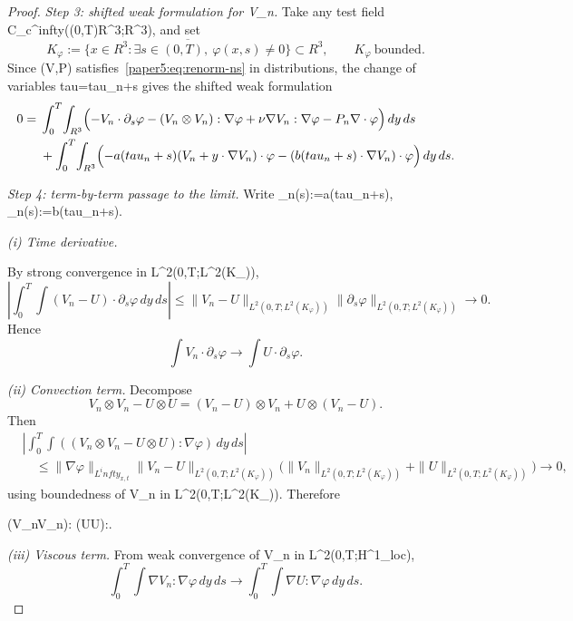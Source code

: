 \documentclass[11pt]{amsart}
\def\({}%
\def\){}%
\def\mathrm#1{#1}%
\def\mathbb#1{#1}%
\def\tau{tau}%
\def\infty{infty}%
\theoremstyle{plain}
\theoremstyle{definition}
\theoremstyle{remark}
\begin{document}
\begin{proof}
\emph{Step 3: shifted weak formulation for \(V_n\).}
Take any test field
\(\varphi\in C_c^\infty((0,T)\times\mathbb R^3;\mathbb R^3)\), and set
\[
K_\varphi:=\overline{\{x\in\mathbb R^3:\exists s\in(0,T),\ \varphi(x,s)\neq0\}}
\subset\mathbb R^3,\qquad K_\varphi\ \text{bounded}.
\]
Since \((V,P)\) satisfies~\eqref{paper5:eq:renorm-ns} in distributions, the change of variables
\(\tau=\tau_n+s\) gives the shifted weak formulation
\begin{equation}\label{paper5:eq:weak-n}
\begin{aligned}
0={}&\int_0^T\!\int_{\mathbb R^3}
\Bigl(
-V_n\cdot\partial_s\varphi
-(V_n\otimes V_n):\nabla\varphi
+\nu\nabla V_n:\nabla\varphi
-P_n\nabla\cdot\varphi
\Bigr)\,dy\,ds\\
&+\int_0^T\!\int_{\mathbb R^3}
\Bigl(
-a(\tau_n+s)(V_n+y\cdot\nabla V_n)\cdot\varphi
-(b(\tau_n+s)\cdot\nabla V_n)\cdot\varphi
\Bigr)\,dy\,ds.
\end{aligned}
\end{equation}

\emph{Step 4: term-by-term passage to the limit.}
Write \(\alpha_n(s):=a(\tau_n+s)\), \(\beta_n(s):=b(\tau_n+s)\).

\medskip
\noindent\textit{(i) Time derivative.}

By strong convergence in \(L^2(0,T;L^2(K_\varphi))\),
\[
  \left|\int_0^T\!\int (V_n-U)\cdot\partial_s\varphi
  \,dy\,ds\right|
  \le
  \|V_n-U\|_{L^2(0,T;L^2(K_\varphi))}
  \|\partial_s\varphi\|_{L^2(0,T;L^2(K_\varphi))}
  \to0.
\]
Hence
\[\int V_n\cdot\partial_s\varphi\to\int U\cdot\partial_s\varphi.
\]

\medskip
\noindent\textit{(ii) Convection term.}
Decompose
\[
  V_n\otimes V_n-U\otimes U=(V_n-U)\otimes V_n+U\otimes(V_n-U).
\]
Then
\[
\begin{aligned}
&\left|\int_0^T\!\int((V_n\otimes V_n-U\otimes U):\nabla\varphi)
  \,dy\,ds\right|\\
&\quad\le
  \|\nabla\varphi\|_{L^\infty_{x,t}}
  \|V_n-U\|_{L^2(0,T;L^2(K_\varphi))}
  \bigl(\|V_n\|_{L^2(0,T;L^2(K_\varphi))}
  +\|U\|_{L^2(0,T;L^2(K_\varphi))}\bigr)
  \to0,
\end{aligned}
\]
using boundedness of \(V_n\) in \(L^2(0,T;L^2(K_\varphi))\). Therefore
\(
  \int(V_n\otimes V_n):\nabla\varphi
  \to\int(U\otimes U):\nabla\varphi.
\)

\medskip
\noindent\textit{(iii) Viscous term.}
From weak convergence of \(V_n\) in \(L^2(0,T;H^1_{\mathrm{loc}})\),
\[
  \int_0^T\!\int\nabla V_n:\nabla\varphi
  \,dy\,ds
  \to
  \int_0^T\!\int\nabla U:\nabla\varphi
  \,dy\,ds.
\]


\end{proof}
\end{document}
